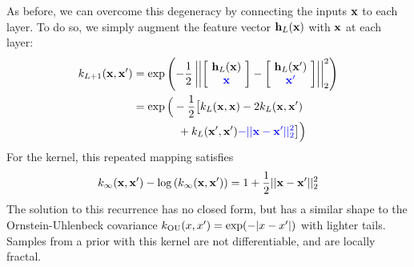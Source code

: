 As before, we can overcome this degeneracy by %
connecting the inputs ${\bf{x}}$ to each layer.  To do so, we simply augment the feature vector ${\bf{h}}_{L}({\bf{x}})$ with ${\bf{x}}$ at each layer: 
%
\begin{align}
 k_{L+1}(\vx, \vx') %
& = \exp \left( -\frac{1}{2} \left|\left| \left[ \! \begin{array}{c} \hPhi_{L}(\vx) \\ {\color{blue} \vx} \end{array} \! \right]  - \left[ \! \begin{array}{c} \hPhi_{L}(\vx') \\ {\color{blue} \vx'} \end{array} \! \right] \right| \right|_2^2 \right) \nonumber \\
& = \exp \Big( -\frac{1}{2} \big[ k_{L}(\vx, \vx) - 2 k_{L}(\vx, \vx') \nonumber \\ 
& \qquad \qquad + k_{L}(\vx', \vx') {\color{blue} - || \vx - \vx' ||_2^2} \big] \Big)
\end{align}
%
For the  kernel, this repeated mapping satisfies
\begin{align}
k_\infty({\bf{x}}, {\bf{x}}') - \log \left( k_\infty({\bf{x}}, {\bf{x}}') \right) = 1 + \frac{1}{2} || {\bf{x}} - {\bf{x}}' ||_2^2
\end{align}
%
The solution to this recurrence has no closed form, but has a similar shape to the Ornstein-Uhlenbeck covariance ${k_{\textnormal{OU}}(x,x') = \exp( -|x - x'| )}$ with lighter tails.
%
Samples from a \gp{} prior with this kernel are not differentiable, and are locally fractal.

